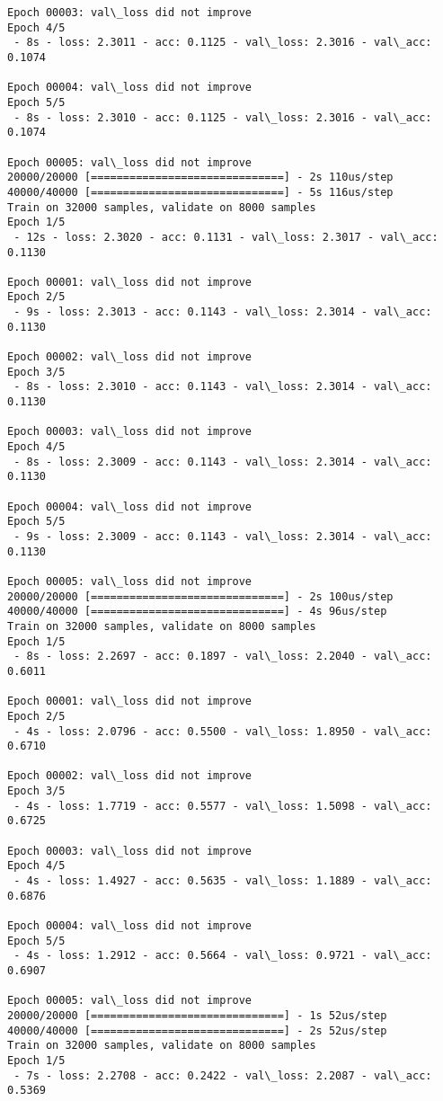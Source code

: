 \documentclass[11pt]{article}
\begin{document}
\begin{Verbatim}[commandchars=\\\{\}]
Epoch 00003: val\_loss did not improve
Epoch 4/5
 - 8s - loss: 2.3011 - acc: 0.1125 - val\_loss: 2.3016 - val\_acc: 0.1074

Epoch 00004: val\_loss did not improve
Epoch 5/5
 - 8s - loss: 2.3010 - acc: 0.1125 - val\_loss: 2.3016 - val\_acc: 0.1074

Epoch 00005: val\_loss did not improve
20000/20000 [==============================] - 2s 110us/step
40000/40000 [==============================] - 5s 116us/step
Train on 32000 samples, validate on 8000 samples
Epoch 1/5
 - 12s - loss: 2.3020 - acc: 0.1131 - val\_loss: 2.3017 - val\_acc: 0.1130

Epoch 00001: val\_loss did not improve
Epoch 2/5
 - 9s - loss: 2.3013 - acc: 0.1143 - val\_loss: 2.3014 - val\_acc: 0.1130

Epoch 00002: val\_loss did not improve
Epoch 3/5
 - 8s - loss: 2.3010 - acc: 0.1143 - val\_loss: 2.3014 - val\_acc: 0.1130

Epoch 00003: val\_loss did not improve
Epoch 4/5
 - 8s - loss: 2.3009 - acc: 0.1143 - val\_loss: 2.3014 - val\_acc: 0.1130

Epoch 00004: val\_loss did not improve
Epoch 5/5
 - 9s - loss: 2.3009 - acc: 0.1143 - val\_loss: 2.3014 - val\_acc: 0.1130

Epoch 00005: val\_loss did not improve
20000/20000 [==============================] - 2s 100us/step
40000/40000 [==============================] - 4s 96us/step
Train on 32000 samples, validate on 8000 samples
Epoch 1/5
 - 8s - loss: 2.2697 - acc: 0.1897 - val\_loss: 2.2040 - val\_acc: 0.6011

Epoch 00001: val\_loss did not improve
Epoch 2/5
 - 4s - loss: 2.0796 - acc: 0.5500 - val\_loss: 1.8950 - val\_acc: 0.6710

Epoch 00002: val\_loss did not improve
Epoch 3/5
 - 4s - loss: 1.7719 - acc: 0.5577 - val\_loss: 1.5098 - val\_acc: 0.6725

Epoch 00003: val\_loss did not improve
Epoch 4/5
 - 4s - loss: 1.4927 - acc: 0.5635 - val\_loss: 1.1889 - val\_acc: 0.6876

Epoch 00004: val\_loss did not improve
Epoch 5/5
 - 4s - loss: 1.2912 - acc: 0.5664 - val\_loss: 0.9721 - val\_acc: 0.6907

Epoch 00005: val\_loss did not improve
20000/20000 [==============================] - 1s 52us/step
40000/40000 [==============================] - 2s 52us/step
Train on 32000 samples, validate on 8000 samples
Epoch 1/5
 - 7s - loss: 2.2708 - acc: 0.2422 - val\_loss: 2.2087 - val\_acc: 0.5369


\end{Verbatim}
\end{document}
